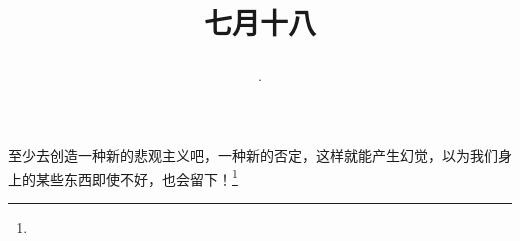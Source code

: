 \title{\date[d=21,m=8,y=2024][year:cn-y,年,month:cn,day:cn,日,·,weekday]·七月十八 }
至少去创造一种新的悲观主义吧，一种新的否定，这样就能产生幻觉，以为我们身上的某些东西即使不好，也会留下！\footnote{ }

